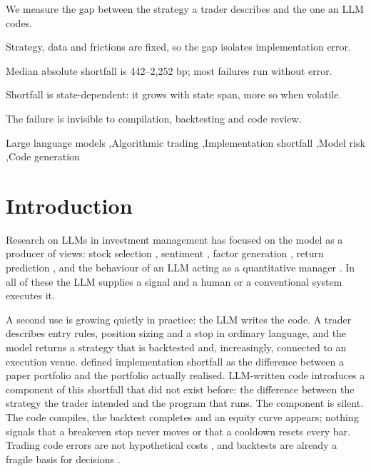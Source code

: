 \documentclass[a4paper,fleqn]{cas-sc}
\begin{document}
\begin{highlights}
\item We measure the gap between the strategy a trader describes and the one an LLM codes.
\item Strategy, data and frictions are fixed, so the gap isolates implementation error.
\item Median absolute shortfall is 442--2{,}252 bp; most failures run without error.
\item Shortfall is state-dependent: it grows with state span, more so when volatile.
\item The failure is invisible to compilation, backtesting and code review.
\end{highlights}

\begin{keywords}
Large language models \sep Algorithmic trading \sep Implementation shortfall \sep Model risk \sep Code generation
\end{keywords}

\maketitle

\section{Introduction}

Research on LLMs in investment management has focused on the model as a producer of views: stock selection \citep{ko2024,pelster2024}, sentiment \citep{kirtac2024}, factor generation \citep{cheng2024}, return prediction \citep{lopezlira2023}, and the behaviour of an LLM acting as a quantitative manager \citep{kim2023}. In all of these the LLM supplies a signal and a human or a conventional system executes it.

A second use is growing quietly in practice: the LLM writes the code. A trader describes entry rules, position sizing and a stop in ordinary language, and the model returns a strategy that is backtested and, increasingly, connected to an execution venue. \citet{perold1988} defined implementation shortfall as the difference between a paper portfolio and the portfolio actually realised. LLM-written code introduces a component of this shortfall that did not exist before: the difference between the strategy the trader intended and the program that runs. The component is silent. The code compiles, the backtest completes and an equity curve appears; nothing signals that a breakeven stop never moves or that a cooldown resets every bar. Trading code errors are not hypothetical costs \citep{sec2013knight}, and backtests are already a fragile basis for decisions \citep{bailey2016}.
\end{document}
